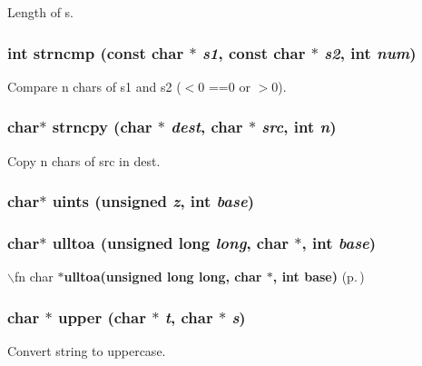 Length of s.

\subsubsection{\setlength{\rightskip}{0pt plus 5cm}int strncmp (const char $\ast$ {\em s1}, const char $\ast$ {\em s2}, int {\em num})}\label{hpstring_8h_a7}


Compare n chars of s1 and s2 ($<$0 ==0 or $>$0).

\subsubsection{\setlength{\rightskip}{0pt plus 5cm}char$\ast$ strncpy (char $\ast$ {\em dest}, char $\ast$ {\em src}, int {\em n})}\label{hpstring_8h_a4}


Copy n chars of src in dest.

\subsubsection{\setlength{\rightskip}{0pt plus 5cm}char$\ast$ uints (unsigned {\em z}, int {\em base})}\label{hpstring_8h_a24}


\subsubsection{\setlength{\rightskip}{0pt plus 5cm}char$\ast$ ulltoa (unsigned long {\em long}, char $\ast$, int {\em base})}\label{hpstring_8h_a11}


$\backslash$fn char $\ast${\bf ulltoa(unsigned long long, char $\ast$, int base)} {\rm (p.\,\pageref{hpstring_8h_a11})}

\subsubsection{\setlength{\rightskip}{0pt plus 5cm}char $\ast$ upper (char $\ast$ {\em t}, char $\ast$ {\em s})}\label{hpstring_8h_a12}


Convert string to uppercase.

